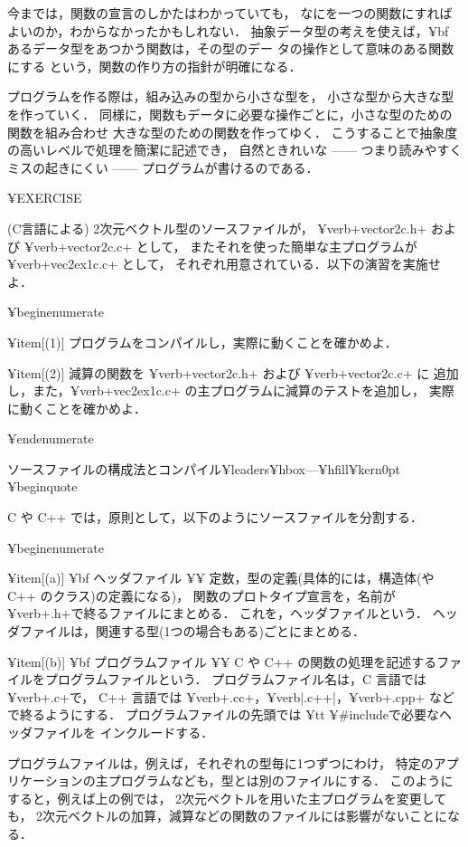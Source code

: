 今までは，関数の宣言のしかたはわかっていても，
なにを一つの関数にすればよいのか，わからなかったかもしれない．
抽象データ型の考えを使えば，{¥bf あるデータ型をあつかう関数は，その型のデー
タの操作として意味のある関数にする}
という，関数の作り方の指針が明確になる．

プログラムを作る際は，組み込みの型から小さな型を，
小さな型から大きな型を作っていく．
同様に，関数もデータに必要な操作ごとに，小さな型のための関数を組み合わせ
大きな型のための関数を作ってゆく．
こうすることで抽象度の高いレベルで処理を簡潔に記述でき，
自然ときれいな ------ つまり読みやすくミスの起きにくい ------
プログラムが書けるのである．

¥EXERCISE{
(C言語による) 2次元ベクトル型のソースファイルが，
¥verb+vector2c.h+ および ¥verb+vector2c.c+ として，
またそれを使った簡単な主プログラムが ¥verb+vec2ex1c.c+ として，
それぞれ用意されている．以下の演習を実施せよ．

¥begin{enumerate}

¥item[(1)] プログラムをコンパイルし，実際に動くことを確かめよ．

¥item[(2)] 減算の関数を ¥verb+vector2c.h+ および ¥verb+vector2c.c+ に
追加し，また，¥verb+vec2ex1c.c+ の主プログラムに減算のテストを追加し，
実際に動くことを確かめよ．


¥end{enumerate}

}


ソースファイルの構成法とコンパイル¥leaders¥hbox{---}¥hfill¥kern0pt %
¥begin{quote}

C や C++ では，原則として，以下のようにソースファイルを分割する．

¥begin{enumerate}

 ¥item[(a)] {¥bf ヘッダファイル}	¥¥
定数，型の定義(具体的には，構造体(や C++ のクラス)の定義になる)，
関数のプロトタイプ宣言を，名前が¥verb+.h+で終るファイルにまとめる．
これを，ヘッダファイルという．
ヘッダファイルは，関連する型(1つの場合もある)ごとにまとめる．

 ¥item[(b)] {¥bf プログラムファイル}	¥¥
C や C++ の関数の処理を記述するファイルをプログラムファイルという．
プログラムファイル名は，C 言語では ¥verb+.c+で，
C++ 言語では ¥verb+.cc+，¥verb|.c++|，¥verb+.cpp+ などで終るようにする．
プログラムファイルの先頭では {¥tt ¥#include}で必要なヘッダファイルを
インクルードする．

プログラムファイルは，例えば，それぞれの型毎に1つずつにわけ，
特定のアプリケーションの主プログラムなども，型とは別のファイルにする．
このようにすると，例えば上の例では，
2次元ベクトルを用いた主プログラムを変更しても，
2次元ベクトルの加算，減算などの関数のファイルには影響がないことになる．

